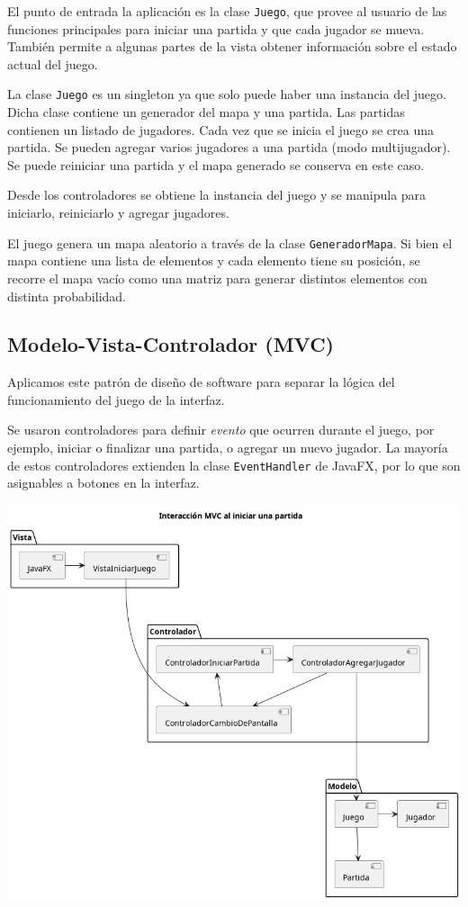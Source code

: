 \documentclass[titlepage,a4paper]{article}
\begin{document}
El punto de entrada la aplicación es la clase \texttt{Juego}, que provee al
usuario de las funciones principales para iniciar una partida y que
cada jugador se mueva. También permite a algunas partes de la vista
obtener información sobre el estado actual del juego.

La clase \texttt{Juego} es un singleton ya que solo puede haber una instancia
del juego. Dicha clase contiene un generador del mapa y una
partida. Las partidas contienen un listado de jugadores. Cada vez que
se inicia el juego se crea una partida. Se pueden agregar varios
jugadores a una partida (modo multijugador). Se puede reiniciar una
partida y el mapa generado se conserva en este caso.

Desde los controladores se obtiene la instancia del juego y se
manipula para iniciarlo, reiniciarlo y agregar jugadores.

El juego genera un mapa aleatorio a través de la clase
\texttt{GeneradorMapa}. Si bien el mapa contiene una lista de elementos y
cada elemento tiene su posición, se recorre el mapa vacío como una
matriz para generar distintos elementos con distinta probabilidad.

\subsection{Modelo-Vista-Controlador (MVC)}
\label{sec:orgab9015b}

Aplicamos este patrón de diseño de software para separar la lógica del
funcionamiento del juego de la interfaz.

Se usaron controladores para definir \emph{evento} que ocurren durante el
juego, por ejemplo, iniciar o finalizar una partida, o agregar un
nuevo jugador. La mayoría de estos controladores extienden la clase
\texttt{EventHandler} de JavaFX, por lo que son asignables a botones en la
interfaz.

\begin{center}
\includegraphics[width=.9\linewidth]{./diagramas/mvc-partida.png}
\end{center}
\end{document}
